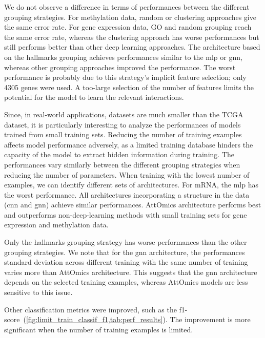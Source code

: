 \documentclass[../main.tex]{subfiles}
\begin{document}
		We do not observe a difference in terms of performances between the different grouping strategies.
		For methylation data, random or clustering approaches give the same error rate.
		For gene expression data, GO and random grouping reach the same error rate, whereas the clustering approach has worse performances but still performs better than other deep learning approaches.
		The architecture based on the hallmarks grouping achieves performances similar to the \gls{mlp} or \gls{gnn}, whereas other grouping approaches improved the performance.
		The worst performance is probably due to this strategy's implicit feature selection; only 4305 genes were used.
		A too-large selection of the number of features limits the potential for the model to learn the relevant interactions.

		Since, in real-world applications, datasets are much smaller than the TCGA dataset, it is particularly interesting to analyze the performances of models trained from small training sets.
		Reducing the number of training examples affects model performance adversely, as a limited training database hinders the capacity of the model to extract hidden information during training.
		The performances vary similarly between the different grouping strategies when reducing the number of parameters.
		When training with the lowest number of examples, we can identify different sets of architectures.
		For mRNA, the \gls{mlp} has the worst performance.
		All architectures incorporating a structure in the data (\gls{cnn} and \gls{gnn}) achieve similar performances.
		AttOmics architecture performs best and outperforms non-deep-learning methods with small training sets for gene expression and methylation data.

		Only the hallmarks grouping strategy has worse performances than the other grouping strategies.
		We note that for the \gls{gnn} architecture, the performances standard deviation across different training with the same number of training varies more than AttOmics architecture.
		This suggests that the \gls{gnn} architecture depends on the selected training examples, whereas AttOmics models are less sensitive to this issue.

		Other classification metrics were improved, such as the f1-score~(\cref{fig:limit_train_classif_f1,tab:perf_results}).
		The improvement is more significant when the number of training examples is limited.
\end{document}
